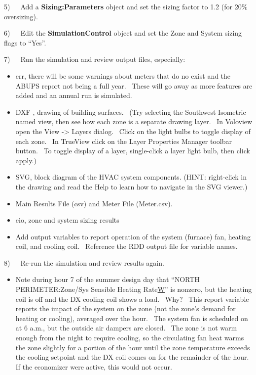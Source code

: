 5)~~~Add a \textbf{Sizing:Parameters} object and set the sizing factor to 1.2 (for 20\% oversizing).

6)~~~Edit the \textbf{SimulationControl} object and set the Zone and System sizing flags to ``Yes''.

7)~~~Run the simulation and review output files, especially:

\begin{itemize}
\item
  err, there will be some warnings about meters that do no exist and the ABUPS report not being a full year.~ These will go away as more features are added and an annual run is simulated.
\item
  DXF , drawing of building surfaces.~ (Try selecting the Southwest Isometric named view, then see how each zone is a separate drawing layer.~ In Voloview open the View -\textgreater{} Layers dialog.~ Click on the light bulbs to toggle display of each zone.~ In TrueView click on the Layer Properties Manager toolbar button.~ To toggle display of a layer, single-click a layer light bulb, then click apply.)
\item
  SVG, block diagram of the HVAC system components. (HINT: right-click in the drawing and read the Help to learn how to navigate in the SVG viewer.)
\item
  Main Results File (csv) and Meter File (Meter.csv).
\item
  eio, zone and system sizing results
\item
  Add output variables to report operation of the system (furnace) fan, heating coil, and cooling coil.~ Reference the RDD output file for variable names.
\end{itemize}

8)~~~Re-run the simulation and review results again.

\begin{itemize}
\tightlist
\item
  Note during hour 7 of the summer design day that ``NORTH PERIMETER:Zone/Sys Sensible Heating Rate\href{Hourly}{W}'' is nonzero, but the heating coil is off and the DX cooling coil shows a load.~ Why?~ This report variable reports the impact of the system on the zone (not the zone's demand for heating or cooling), averaged over the hour.~ The system fan is scheduled on at 6 a.m., but the outside air dampers are closed.~ The zone is not warm enough from the night to require cooling, so the circulating fan heat warms the zone slightly for a portion of the hour until the zone temperature exceeds the cooling setpoint and the DX coil comes on for the remainder of the hour.~ If the economizer were active, this would not occur.
\end{itemize}

